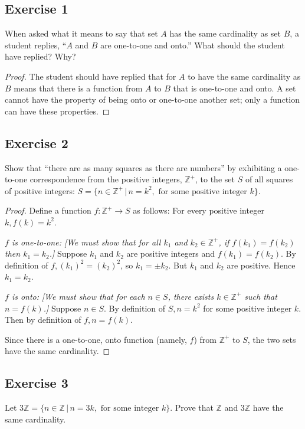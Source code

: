 \documentclass[14pt]{extarticle}
\newcommand{\Z}{\mathbb{Z}}
\begin{document}
\subsection{Exercise 1}
When asked what it means to say that set $A$ has the same cardinality as set $B$, a student replies, “$A$ and $B$ are
one-to-one and onto.” What should the student have replied? Why?

\begin{proof}
    The student should have replied that for $A$ to have the same cardinality as $B$ means that there is a function from
    $A$ to $B$ that is one-to-one and onto. A set cannot have the property of being onto or one-to-one another set; only
    a function can have these properties.
\end{proof}

\subsection{Exercise 2}
Show that “there are as many squares as there are numbers” by exhibiting a one-to-one correspondence from the positive
integers, $\Z^+$, to the set $S$ of all squares of positive integers: \(S = \{n \in \Z^+ \, | \, n = k^2,
\text{ for some positive integer } k\}\).

\begin{proof}
    Define a function \(f: \Z^+ \to S\) as follows: For every positive integer \(k, f(k) = k^2\).

        {\it $f$ is one-to-one:} {\it [We must show that for all $k_1$ and \(k_2 \in \Z^+\), if \(f(k_1) = f(k_2)\) then
                \(k_1 = k_2\).]} Suppose $k_1$ and $k_2$ are positive integers and \(f(k_1) = f(k_2)\). By definition of \(f, (k_1)^2 = (k_2)^2\), so \(k_1 = \pm k_2\). But $k_1$ and $k_2$ are positive. Hence \(k_1 = k_2\).

        {\it $f$ is onto:} {\it [We must show that for each \(n \in S\), there exists \(k \in \Z^+\) such that \(n = f(k)\).]}
    Suppose \(n \in S\). By definition of \(S, n = k^2\) for some positive integer $k$. Then by definition of \(f, n = f(k)\).

    Since there is a one-to-one, onto function (namely, $f$) from $\Z^+$ to $S$, the two sets have the same cardinality.
\end{proof}

\subsection{Exercise 3}
Let \(3\Z = \{n \in \Z \,|\, n = 3k, \text{ for some integer } k\}\). Prove that $\Z$ and $3\Z$ have the same
cardinality.
\end{document}
